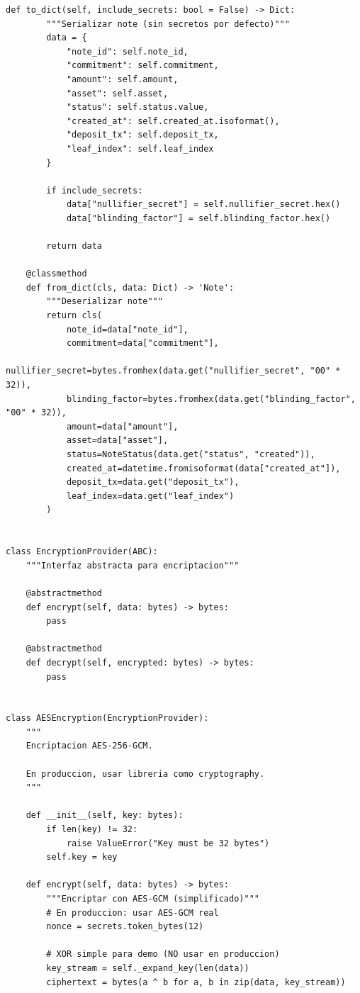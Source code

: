 \documentclass[11pt,a4paper,twoside]{book}
\theoremstyle{definition}
\theoremstyle{remark}
\begin{document}
\begin{lstlisting}[style=python, caption={Sistema completo de gestión de notes}]
    def to_dict(self, include_secrets: bool = False) -> Dict:
        """Serializar note (sin secretos por defecto)"""
        data = {
            "note_id": self.note_id,
            "commitment": self.commitment,
            "amount": self.amount,
            "asset": self.asset,
            "status": self.status.value,
            "created_at": self.created_at.isoformat(),
            "deposit_tx": self.deposit_tx,
            "leaf_index": self.leaf_index
        }
        
        if include_secrets:
            data["nullifier_secret"] = self.nullifier_secret.hex()
            data["blinding_factor"] = self.blinding_factor.hex()
        
        return data
    
    @classmethod
    def from_dict(cls, data: Dict) -> 'Note':
        """Deserializar note"""
        return cls(
            note_id=data["note_id"],
            commitment=data["commitment"],
            nullifier_secret=bytes.fromhex(data.get("nullifier_secret", "00" * 32)),
            blinding_factor=bytes.fromhex(data.get("blinding_factor", "00" * 32)),
            amount=data["amount"],
            asset=data["asset"],
            status=NoteStatus(data.get("status", "created")),
            created_at=datetime.fromisoformat(data["created_at"]),
            deposit_tx=data.get("deposit_tx"),
            leaf_index=data.get("leaf_index")
        )


class EncryptionProvider(ABC):
    """Interfaz abstracta para encriptacion"""
    
    @abstractmethod
    def encrypt(self, data: bytes) -> bytes:
        pass
    
    @abstractmethod
    def decrypt(self, encrypted: bytes) -> bytes:
        pass


class AESEncryption(EncryptionProvider):
    """
    Encriptacion AES-256-GCM.
    
    En produccion, usar libreria como cryptography.
    """
    
    def __init__(self, key: bytes):
        if len(key) != 32:
            raise ValueError("Key must be 32 bytes")
        self.key = key
    
    def encrypt(self, data: bytes) -> bytes:
        """Encriptar con AES-GCM (simplificado)"""
        # En produccion: usar AES-GCM real
        nonce = secrets.token_bytes(12)
        
        # XOR simple para demo (NO usar en produccion)
        key_stream = self._expand_key(len(data))
        ciphertext = bytes(a ^ b for a, b in zip(data, key_stream))
        

\end{lstlisting}
\end{document}
